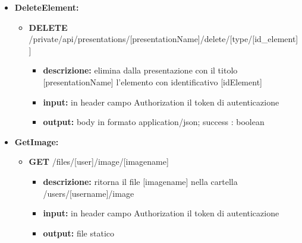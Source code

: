 {{\begin{itemize}
\begin{itemize}
			\item  \textbf{PUT} /private/api/presentations/[presentationName]/element
				\begin{itemize} 
				\item \textbf{descrizione:} sostituisce nella presentazione dell'utente l'elemento passato nel body della richiesta
				\item \textbf{input:} in header campo Authorization il token di autenticazione, nel body in formato application/json l'oggetto: element : object
				\item \textbf{output:} body in formato application/json; success : boolean
				\end{itemize}
			\end{itemize}
				
		\item \textbf{DeleteElement:}
			\begin{itemize}
			\item   \textbf{DELETE} /private/api/presentations/[presentationName]/delete/[type/[id\_element]]
				\begin{itemize} 
				\item \textbf{descrizione:} elimina dalla presentazione con il titolo [presentationName] l'elemento con identificativo [idElement]						
				\item \textbf{input:} in header campo Authorization il token di autenticazione
				\item \textbf{output:} body in formato application/json; success : boolean
				\end{itemize}
			\end{itemize}
			
			
		\item \textbf{GetImage:}
			\begin{itemize}
			\item    \textbf{GET} /files/[user]/image/[imagename]
				\begin{itemize} 
				\item \textbf{descrizione:} ritorna il file [imagename] nella cartella /users/[username]/image
				\item \textbf{input:} in header campo Authorization il token di autenticazione
				\item \textbf{output:} file statico
				\end{itemize}
			\end{itemize}
			

\end{itemize}}}
